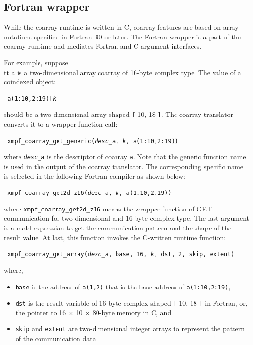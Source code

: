 \subsection{Fortran wrapper}
While the coarray runtime is written in C, coarray features are 
based on array notations specified in Fortran~90 or later.
The Fortran wrapper is a part of the coarray runtime and mediates
Fortran and C argument interfaces.

For example, suppose {\\tt a} is a two-dimensional array coarray of 
16-byte complex type. The value of a coindexed object:
\begin{center}\tt
a(1:10,2:19)[{\it k}]
\end{center}
should be a two-dimensional array shaped {\tt [} 10, 18 {\tt ]}. 
The coarray translator converts it to a wrapper function call:
\begin{center}\tt
xmpf\_coarray\_get\_generic({\it desc\_}a, {\it k}, a(1:10,2:19))
\end{center}
where {\tt{\it desc\_}a} is the descriptor of coarray {\tt a}.
Note that the generic function name is used in the output of the coarray
translator. The corresponding specific name is selected in the 
following Fortran compiler as shown below:
\begin{center}\tt
xmpf\_coarray\_get2d\_z16({\it desc\_}a, {\it k}, a(1:10,2:19))
\end{center}
where {\tt xmpf\_coarray\_get2d\_z16} means the wrapper function
of GET communication for two-dimensional and 16-byte complex type.
The last argument is a mold expression to get the communication pattern 
and the shape of the result value.
At last, this function invokes the C-written runtime function:
\begin{center}\tt
xmpf\_coarray\_get\_array({\it desc\_}a,\,base,\,16,\,{\it k},\,dst,\,2,\,skip,\,extent)
\end{center}
where, 
\begin{itemize}
\item
{\tt base} is the address of {\tt a(1,2)} that is the base address of 
{\tt a(1:10,2:19)},
\item
{\tt dst} is the result variable of 16-byte complex shaped {\tt [} 10, 18 {\tt ]}
in Fortran, or, the pointer to 16 $\times$ 10 $\times$ 80-byte memory in C, and
\item
{\tt skip} and {\tt extent} are two-dimensional integer arrays to represent 
the pattern of the communication data.
\end{itemize}

